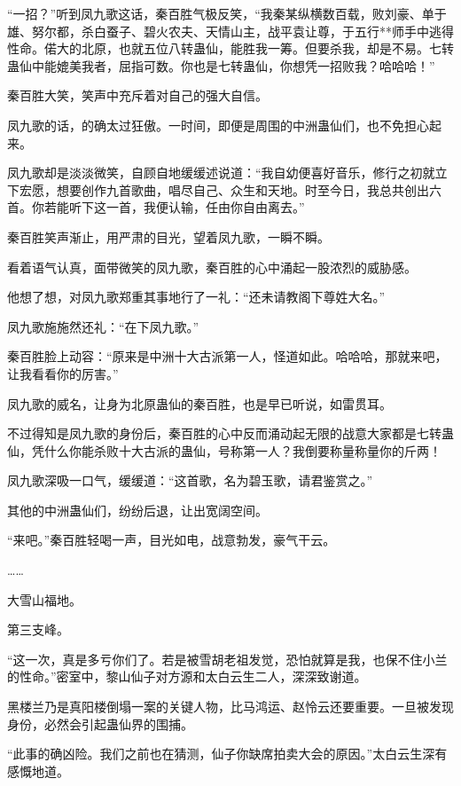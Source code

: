 
\begin{this_body}

“一招？”听到凤九歌这话，秦百胜气极反笑，“我秦某纵横数百载，败刘豪、单于雄、努尔都，杀白蚕子、碧火农夫、天情山主，战平袁让尊，于五行**师手中逃得性命。偌大的北原，也就五位八转蛊仙，能胜我一筹。但要杀我，却是不易。七转蛊仙中能媲美我者，屈指可数。你也是七转蛊仙，你想凭一招败我？哈哈哈！”

秦百胜大笑，笑声中充斥着对自己的强大自信。

凤九歌的话，的确太过狂傲。一时间，即便是周围的中洲蛊仙们，也不免担心起来。

凤九歌却是淡淡微笑，自顾自地缓缓述说道：“我自幼便喜好音乐，修行之初就立下宏愿，想要创作九首歌曲，唱尽自己、众生和天地。时至今日，我总共创出六首。你若能听下这一首，我便认输，任由你自由离去。”

秦百胜笑声渐止，用严肃的目光，望着凤九歌，一瞬不瞬。

看着语气认真，面带微笑的凤九歌，秦百胜的心中涌起一股浓烈的威胁感。

他想了想，对凤九歌郑重其事地行了一礼：“还未请教阁下尊姓大名。”

凤九歌施施然还礼：“在下凤九歌。”

秦百胜脸上动容：“原来是中洲十大古派第一人，怪道如此。哈哈哈，那就来吧，让我看看你的厉害。”

凤九歌的威名，让身为北原蛊仙的秦百胜，也是早已听说，如雷贯耳。

不过得知是凤九歌的身份后，秦百胜的心中反而涌动起无限的战意大家都是七转蛊仙，凭什么你能杀败十大古派的蛊仙，号称第一人？我倒要称量称量你的斤两！

凤九歌深吸一口气，缓缓道：“这首歌，名为碧玉歌，请君鉴赏之。”

其他的中洲蛊仙们，纷纷后退，让出宽阔空间。

“来吧。”秦百胜轻喝一声，目光如电，战意勃发，豪气干云。

……

大雪山福地。

第三支峰。

“这一次，真是多亏你们了。若是被雪胡老祖发觉，恐怕就算是我，也保不住小兰的性命。”密室中，黎山仙子对方源和太白云生二人，深深致谢道。

黑楼兰乃是真阳楼倒塌一案的关键人物，比马鸿运、赵怜云还要重要。一旦被发现身份，必然会引起蛊仙界的围捕。

“此事的确凶险。我们之前也在猜测，仙子你缺席拍卖大会的原因。”太白云生深有感慨地道。


\end{this_body}
